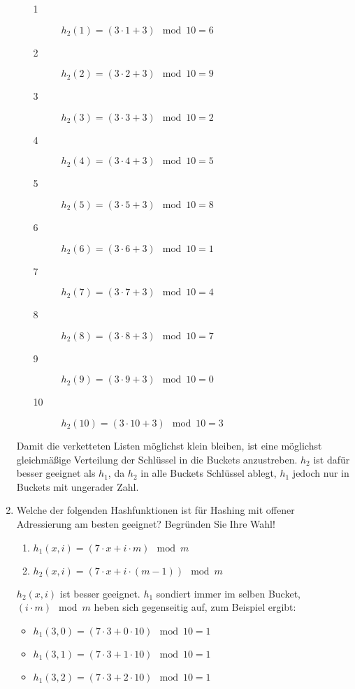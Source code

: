 \documentclass{bschlangaul-aufgabe}
\begin{document}
\begin{enumerate}
\begin{enumerate}
\begin{bAntwort}
\begin{description}
\item[1] $h_2(1) = (3 \cdot 1 + 3) \mod 10 = 6$
\item[2] $h_2(2) = (3 \cdot 2 + 3) \mod 10 = 9$
\item[3] $h_2(3) = (3 \cdot 3 + 3) \mod 10 = 2$
\item[4] $h_2(4) = (3 \cdot 4 + 3) \mod 10 = 5$
\item[5] $h_2(5) = (3 \cdot 5 + 3) \mod 10 = 8$
\item[6] $h_2(6) = (3 \cdot 6 + 3) \mod 10 = 1$
\item[7] $h_2(7) = (3 \cdot 7 + 3) \mod 10 = 4$
\item[8] $h_2(8) = (3 \cdot 8 + 3) \mod 10 = 7$
\item[9] $h_2(9) = (3 \cdot 9 + 3) \mod 10 = 0$
\item[10] $h_2(10) = (3 \cdot 10 + 3) \mod 10 = 3$
\end{description}
\end{bAntwort}
\end{enumerate}

\begin{bAntwort}
Damit die verketteten Listen möglichst klein bleiben, ist eine möglichst
gleichmäßige Verteilung der Schlüssel in die Buckets anzustreben. $h_2$
ist dafür besser geeignet als $h_1$, da $h_2$ in alle Buckets Schlüssel
ablegt, $h_1$ jedoch nur in Buckets mit ungerader Zahl.
\end{bAntwort}


\item Welche der folgenden Hashfunktionen ist für Hashing mit offener
Adressierung am besten geeignet? Begründen
Sie Ihre Wahl!

\begin{enumerate}
\item $h_1(x,i) = (7 \cdot x + i \cdot m) \mod m$
\item $h_2(x,i) = (7 \cdot x + i \cdot (m - 1)) \mod m$
\end{enumerate}

\begin{bAntwort}
$h_2(x,i)$ ist besser geeignet. $h_1$ sondiert immer im selben Bucket,
$(i \cdot m) \mod m$ heben sich gegenseitig auf,
zum Beispiel ergibt:

\begin{itemize}
\item $h_1(3,0) = (7 \cdot 3 + 0 \cdot 10) \mod 10 = 1$
\item $h_1(3,1) = (7 \cdot 3 + 1 \cdot 10) \mod 10 = 1$
\item $h_1(3,2) = (7 \cdot 3 + 2 \cdot 10) \mod 10 = 1$
\end{itemize}


\end{bAntwort}
\end{enumerate}
\end{document}
